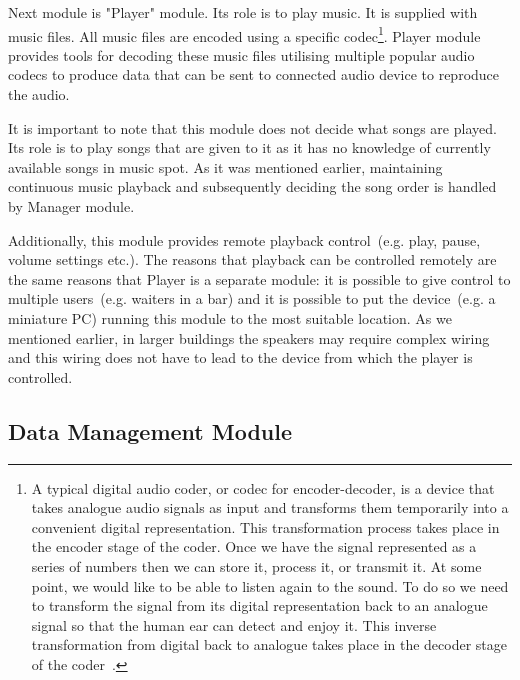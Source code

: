 Next module is "Player" module. Its role is to play music. It is supplied with music files. All music files are encoded using a specific codec\footnote{A typical digital audio coder, or codec for encoder-decoder, is a device that takes analogue audio signals as input and transforms them temporarily into a convenient digital representation. This transformation process takes place in the encoder stage of the coder. Once we have the signal represented as a series of numbers then we can store it, process it, or transmit it. At some point, we would like to be able to listen again to the sound. To do so we need to transform the signal from its digital representation back to an analogue signal so that the human ear can detect and enjoy it. This inverse transformation from digital back to analogue takes place in the decoder stage of the coder~\citep{IntroToDigitalAudio}.}. Player module provides tools for decoding these music files utilising multiple popular audio codecs to produce data that can be sent to connected audio device to reproduce the audio.
\par
It is important to note that this module does not decide what songs are played. Its role is to play songs that are given to it as it has no knowledge of currently available songs in music spot. As it was mentioned earlier, maintaining continuous music playback and subsequently deciding the song order is handled by Manager module.
\par
Additionally, this module provides remote playback control~(e.g. play, pause, volume settings etc.). The reasons that playback can be controlled remotely are the same reasons that Player is a separate module: it is possible to give control to multiple users~(e.g. waiters in a bar) and it is possible to put the device~(e.g. a miniature PC) running this module to the most suitable location. As we mentioned earlier, in larger buildings the speakers may require complex wiring and this wiring does not have to lead to the device from which the player is controlled.

\subsection{Data Management Module}

